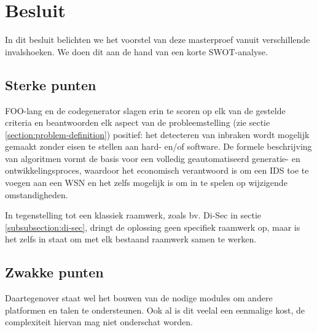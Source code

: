 \chapter{Besluit}
\label{besluit}


In dit besluit belichten we het voorstel van deze masterproef vanuit
verschillende invalshoeken. We doen dit aan de hand van een korte SWOT-analyse.

\section{Sterke punten}
\label{section:strenghts}

FOO-lang en de codegenerator slagen erin te scoren op elk van de gestelde
criteria en beantwoorden elk aspect van de probleemstelling (zie sectie
\ref{section:problem-definition}) positief: het detecteren van inbraken wordt
mogelijk gemaakt zonder eisen te stellen aan hard- en/of software. De formele
beschrijving van algoritmen vormt de basis voor een volledig geautomatiseerd
generatie- en ontwikkelingsproces, waardoor het economisch verantwoord is om
een IDS toe te voegen aan een WSN en het zelfs mogelijk is om in te spelen op
wijzigende omstandigheden.

In tegenstelling tot een klassiek raamwerk, zoals bv. Di-Sec in sectie
\ref{subsubsection:di-sec}, dringt de oplossing geen specifiek raamwerk op,
maar is het zelfs in staat om met elk bestaand raamwerk samen te werken.

\section{Zwakke punten}
\label{section:weaknesses}

Daartegenover staat wel het bouwen van de nodige modules om andere platformen
en talen te ondersteunen. Ook al is dit veelal een eenmalige kost, de
complexiteit hiervan mag niet onderschat worden.

